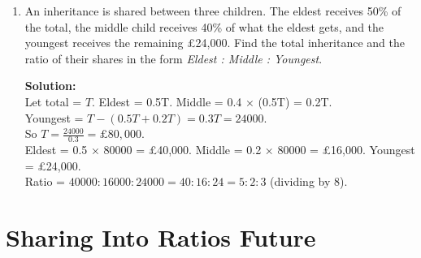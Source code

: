 \documentclass[12pt,a4paper]{article}
\begin{document}
\begin{enumerate}
\item An inheritance is shared between three children. The eldest receives 50\% of the total, the middle child receives 40\% of what the eldest gets, and the youngest receives the remaining £24,000. Find the total inheritance and the ratio of their shares in the form \textit{Eldest : Middle : Youngest}.

\textbf{Solution:}\\
Let total = \( T \). Eldest = 0.5T. Middle = 0.4 × (0.5T) = 0.2T.\\
Youngest = \( T - (0.5T + 0.2T) = 0.3T = 24000 \).\\
So \( T = \frac{24000}{0.3} = £80,000 \).\\
Eldest = 0.5 × 80000 = £40,000. Middle = 0.2 × 80000 = £16,000. Youngest = £24,000.\\
Ratio = \( 40000 : 16000 : 24000 = 40:16:24 = 5:2:3 \) (dividing by 8).

\end{enumerate}

\section*{Sharing Into Ratios Future}
\end{document}
